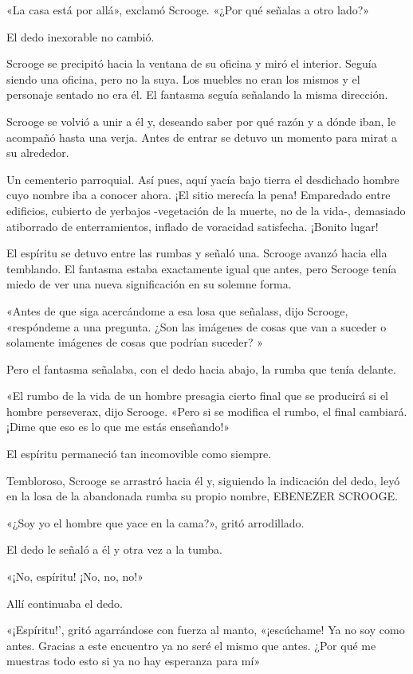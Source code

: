 \documentclass{novela}
\begin{document}
 «La casa está por allá», exclamó Scrooge. «¿Por qué señalas a otro lado?»

 El dedo inexorable no cambió.

 Scrooge se precipitó hacia la ventana de su oficina y miró el interior. Seguía siendo una oficina, pero no la suya. Los muebles no eran los mismos y el personaje sentado no era él. El fantasma seguía señalando la misma dirección.

 Scrooge se volvió a unir a él y, deseando saber por qué razón y a dónde iban, le acompañó hasta una verja. Antes de entrar se detuvo un momento para mirat a su alrededor.

 Un cementerio parroquial. Así pues, aquí yacía bajo tierra el desdichado hombre cuyo nombre iba a conocer ahora. ¡El sitio merecía la pena! Emparedado entre edificios, cubierto de yerbajos -vegetación de la muerte, no de la vida-, demasiado atiborrado de enterramientos, inflado de voracidad satisfecha. ¡Bonito lugar!

 El espíritu se detuvo entre las rumbas y señaló una. Scrooge avanzó hacia ella temblando. El fantasma estaba exactamente igual que antes, pero Scrooge tenía miedo de ver una nueva significación en su solemne forma.

 «Antes de que siga acercándome a esa losa que señalass, dijo Scrooge, «respóndeme a una pregunta. ¿Son las imágenes de cosas que van a suceder o solamente imágenes de cosas que podrían suceder? »

 Pero el fantasma señalaba, con el dedo hacia abajo, la rumba que tenía delante.

 «El rumbo de la vida de un hombre presagia cierto final que se producirá si el hombre perseverax, dijo Scrooge. «Pero si se modifica el rumbo, el final cambiará. ¡Dime que eso es lo que me estás enseñando!»

 El espíritu permaneció tan incomovible como siempre.

 Tembloroso, Scrooge se arrastró hacia él y, siguiendo la indicación del dedo, leyó en la losa de la abandonada rumba su propio nombre, EBENEZER SCROOGE.

 «¿Soy yo el hombre que yace en la cama?», gritó arrodillado.

 El dedo le señaló a él y otra vez a la tumba.

 «¡No, espíritu! ¡No, no, no!»

 Allí continuaba el dedo.

 «¡Espíritu!', gritó agarrándose con fuerza al manto, «¡escúchame! Ya no soy como antes. Gracias a este encuentro ya no seré el mismo que antes. ¿Por qué me muestras todo esto si ya no hay esperanza para mí»
\end{document}
